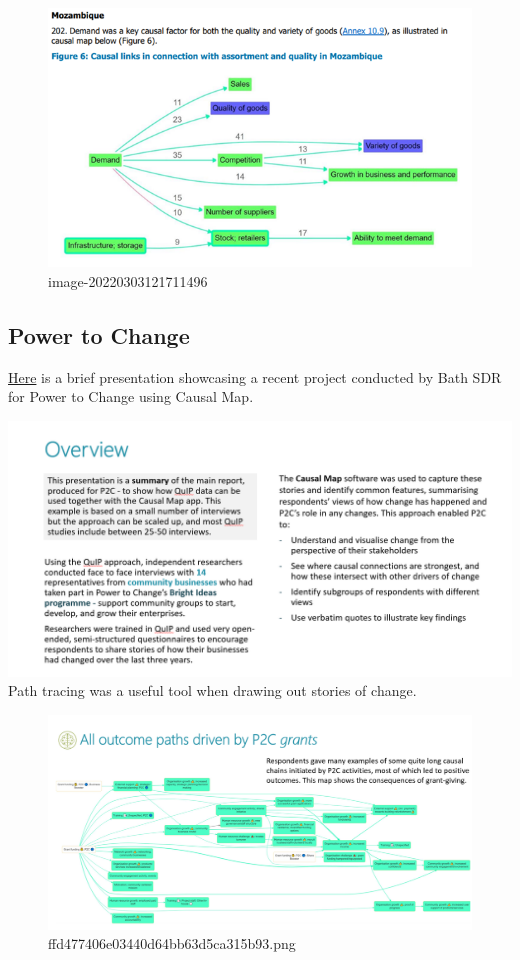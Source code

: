 \documentclass[
]{book}
\begin{document}
\begin{figure}
\centering
\includegraphics[width=6.77083in,height=\textheight]{_assets/image-20220303121711496.png}
\caption{image-20220303121711496}
\end{figure}

\hypertarget{power-to-change}{%
\subsection{Power to Change}\label{power-to-change}}

\href{https://bathsdr.org/wp-content/uploads/2021/03/P2C-QuIP-Summary_Final_short.pdf}{Here} is a brief presentation showcasing a recent project conducted by Bath SDR for Power to Change using Causal Map.

\includegraphics{_assets/de1f66536036d0c064f913bf0cabe84e.png}
Path tracing was a useful tool when drawing out stories of change.

\begin{figure}
\centering
\includegraphics{_assets/ffd477406e03440d64bb63d5ca315b93.png}
\caption{ffd477406e03440d64bb63d5ca315b93.png}
\end{figure}
\end{document}
